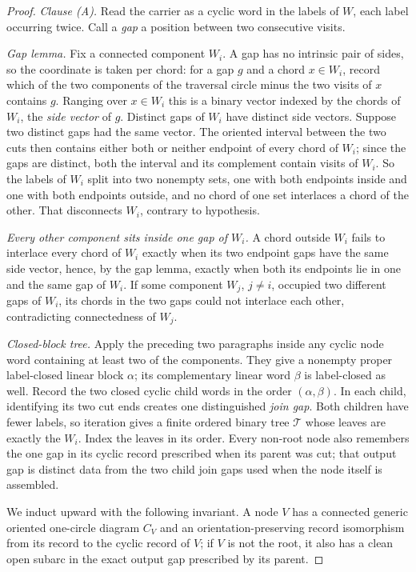 \begin{proof}
\emph{Clause (A).}
Read the carrier as a cyclic word in the labels of $W$, each label occurring
twice. Call a \emph{gap} a position between two consecutive visits.

\emph{Gap lemma.} Fix a connected component $W_i$. A gap has no intrinsic pair
of sides, so the coordinate is taken per chord: for a gap $g$ and a chord
$x\in W_i$, record which of the two components of the traversal circle minus the
two visits of $x$ contains $g$. Ranging over $x\in W_i$ this is a binary vector
indexed by the chords of $W_i$, the \emph{side vector} of $g$. Distinct gaps of $W_i$ have
distinct side vectors. Suppose two distinct gaps had the same vector. The
oriented interval between the two cuts then contains either both or neither
endpoint of every chord of $W_i$; since the gaps are distinct, both the
interval and its complement contain visits of $W_i$. So the labels of $W_i$
split into two nonempty sets, one with both endpoints inside and one with both
endpoints outside, and no chord of one set interlaces a chord of the other.
That disconnects $W_i$, contrary to hypothesis.

\emph{Every other component sits inside one gap of $W_i$.} A chord outside
$W_i$ fails to interlace every chord of $W_i$ exactly when its two endpoint
gaps have the same side vector, hence, by the gap lemma, exactly when both its
endpoints lie in one and the same gap of $W_i$. If some component $W_j$,
$j\neq i$, occupied two different gaps of $W_i$, its chords in the two gaps
could not interlace each other, contradicting connectedness of $W_j$.

\emph{Closed-block tree.} Apply the preceding two paragraphs inside any
cyclic node word containing at least two of the components. They give a
nonempty proper label-closed linear block $\alpha$; its complementary linear
word $\beta$ is label-closed as well. Record the two closed cyclic child words
in the order $(\alpha,\beta)$. In each child, identifying its two cut ends
creates one distinguished \emph{join gap}. Both children have fewer labels,
so iteration gives a finite ordered binary tree $\mathcal T$ whose leaves are
exactly the $W_i$. Index the leaves in its order. Every non-root node also
remembers the one gap in its cyclic record prescribed when its parent was cut;
that output gap is distinct data from the two child join gaps used when the
node itself is assembled.

We induct upward with the following invariant. A node $V$ has a connected
generic oriented one-circle diagram $C_V$ and an orientation-preserving record
isomorphism from its record to the cyclic record of $V$; if $V$ is not the
root, it also has a clean open subarc in the exact output gap prescribed by its
parent.


\end{proof}
